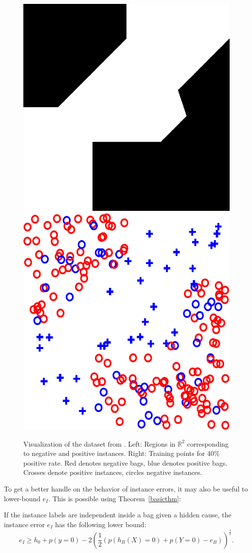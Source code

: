 \begin{figure}[tbp]
	\begin{center}
		\includegraphics[width=.40 \linewidth]{images/gehler_decision_boundary.png}\hspace{5px}
		\includegraphics[width=.40 \linewidth]{images/gehler_instances.png}
	\end{center}
	\caption{Visualization of the dataset from \citet{gehler2007deterministic}. Left: Regions in $\mathbb{R}^2$
    corresponding to negative and positive instances. Right: Training points for 40\% positive rate. Red denotes negative
    bags, blue denotes positive bags. Crosses denote positive instances, circles negative instances.}

\end{figure}
To get a better handle on the behavior of instance errors, it may also be useful to lower-bound $e_I$.
This is possible using Theorem~\ref{basicthm}:

\begin{theorem}\label{lowerbound}
If the instance labels are independent inside a bag given a hidden cause, the instance
error $e_I$ has the following lower bound:
\begin{equation}
e_I \geq h_0 + p(y=0)
- 2 \left (\frac{1}{2} (p(h_B(X)=0) + p(Y=0) - e_B) \right)^\frac{1}{r}.
\end{equation}
\end{theorem}


